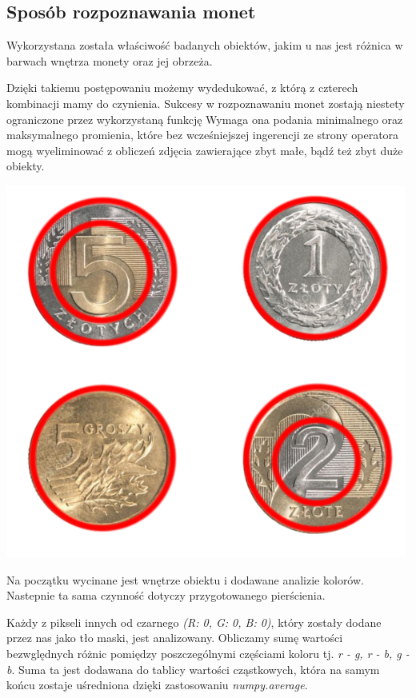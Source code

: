 \documentclass{mwart}
\begin{document}
\subsection{Sposób rozpoznawania monet}

Wykorzystana została właściwość badanych obiektów, jakim u nas jest różnica w barwach wnętrza monety oraz jej obrzeża.

Dzięki takiemu postępowaniu możemy wydedukować, z którą z czterech kombinacji mamy do czynienia. Sukcesy w rozpoznawaniu monet zostają niestety ograniczone przez wykorzystaną funkcję Wymaga ona podania minimalnego oraz maksymalnego promienia, które bez wcześniejszej ingerencji ze strony operatora mogą wyeliminować z obliczeń zdjęcia zawierające zbyt małe, bądź też zbyt duże obiekty.

\begin{center}
    \includegraphics[width=\textwidth]{money.png}
\end{center}

Na początku wycinane jest wnętrze obiektu i dodawane analizie kolorów. Nastepnie ta sama czynność dotyczy przygotowanego pierścienia.

Każdy z pikseli innych od czarnego \textit{(R: 0, G: 0, B: 0)}, który zostały dodane przez nas jako tło maski, jest analizowany. Obliczamy sumę wartości bezwględnych różnic pomiędzy poszczególnymi częściami koloru tj. \textit{r - g, r - b, g - b}. Suma ta jest dodawana do tablicy wartości cząstkowych, która na samym końcu zostaje uśredniona dzięki zastosowaniu \textit{numpy.average}.
\end{document}
